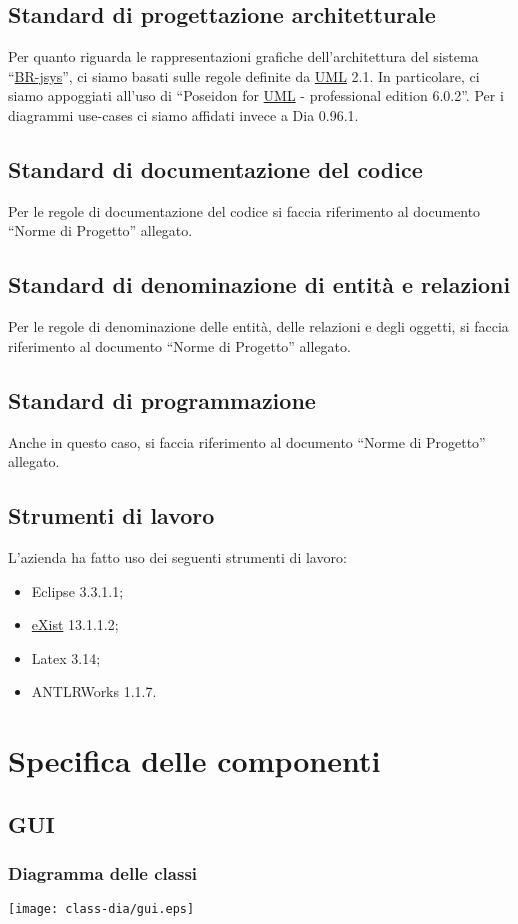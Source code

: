 \section{Standard di progettazione architetturale}
Per quanto riguarda le rappresentazioni grafiche dell'architettura del sistema ``\underline{BR-jsys}'', ci siamo basati sulle regole definite da \underline{UML} 2.1. In particolare, ci siamo appoggiati all'uso di ``Poseidon for \underline{UML} - professional edition 6.0.2''. Per i diagrammi use-cases ci siamo affidati invece a Dia 0.96.1.
\section{Standard di documentazione del codice}
Per le regole di documentazione del codice si faccia riferimento al documento ``Norme di Progetto'' allegato.
\section{Standard di denominazione di entit\`a e relazioni}
Per le regole di denominazione delle entit\`a, delle relazioni e degli oggetti, si faccia riferimento al documento ``Norme di Progetto'' allegato.
\section{Standard di programmazione}
Anche in questo caso, si faccia riferimento al documento ``Norme di Progetto'' allegato.
\section{Strumenti di lavoro}
L'azienda ha fatto uso dei seguenti strumenti di lavoro:
\begin{itemize}
\item Eclipse 3.3.1.1;
\item \underline{eXist} 13.1.1.2; 
\item Latex 3.14;
\item ANTLRWorks 1.1.7.
\end{itemize}
\chapter{Specifica delle componenti}
\section{GUI}
\subsection{Diagramma delle classi}
\begin{center}
\texttt{[image: class-dia/gui.eps]}
\end{center}
